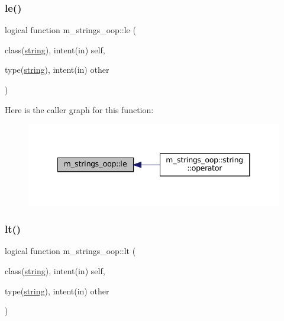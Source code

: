 \subsubsection{\texorpdfstring{le()}{le()}}
{\footnotesize\ttfamily logical function m\+\_\+strings\+\_\+oop\+::le (\begin{DoxyParamCaption}\item[{class(\mbox{\hyperlink{structm__strings__oop_1_1string}{string}}), intent(in)}]{self,  }\item[{type(\mbox{\hyperlink{structm__strings__oop_1_1string}{string}}), intent(in)}]{other }\end{DoxyParamCaption})\hspace{0.3cm}{\ttfamily [private]}}

Here is the caller graph for this function\+:\nopagebreak
\begin{figure}[H]
\begin{center}
\leavevmode
\includegraphics[width=341pt]{namespacem__strings__oop_a103e7c1fab92a1c4cbfff87ec8cd1e23_icgraph}
\end{center}
\end{figure}
\mbox{\label{namespacem__strings__oop_a332288f9bebc563e12671b514512eb30}} 
\subsubsection{\texorpdfstring{lt()}{lt()}}
{\footnotesize\ttfamily logical function m\+\_\+strings\+\_\+oop\+::lt (\begin{DoxyParamCaption}\item[{class(\mbox{\hyperlink{structm__strings__oop_1_1string}{string}}), intent(in)}]{self,  }\item[{type(\mbox{\hyperlink{structm__strings__oop_1_1string}{string}}), intent(in)}]{other }\end{DoxyParamCaption})\hspace{0.3cm}{\ttfamily [private]}}

